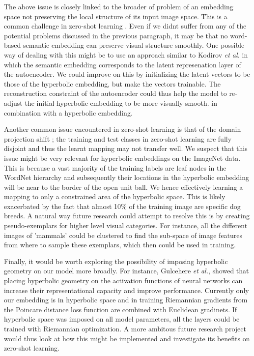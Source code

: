 \documentclass[12pt]{report}
\begin{document}
The above issue is closely linked to the broader of problem of an embedding space not preserving the local structure of its input image space. This is a common challenge in zero-shot learning \cite{Ji2017}. Even if we didnt suffer from any of the potential problems discussed in the previous paragraph, it may be that no word-based semantic embedding can preserve visual structure smoothly. One possible way of dealing with this might be to use an approach similar to Kodirov \textit{et al.} \cite{Kodirov2017} in which the semantic embedding corresponds to the latent represenation layer of the autoencoder. We could improve on this by initializing the latent vectors to be those of the hyperbolic embedding, but make the vectors trainable. The reconstruction constraint of the autoencoder could thus help the model to re-adjust the initial hyperbolic embedding to be more visually smooth.
in combination with a hyperbolic embedding. 

Another common issue encountered in zero-shot learning is that of the domain projection shift \cite{Fu2015}; the training and test classes in zero-shot learning are fully disjoint and thus the learnt mapping may not transfer well. We suspect that this issue might be very relevant for hyperbolic embeddings on the ImageNet data. This is because a vast majority of the training labels are leaf nodes in the WordNet hierarchy and subsequently their locations in the hyperbolic embedding will be near to the border of the open unit ball. We hence effectively learning a mapping to only a constrained area of the hyperbolic space. This is likely exacerbated by the fact that almost 10\% \cite{Peterson2018} of the training image are specific dog breeds. A natural way future research could attempt to resolve this is by creating pseudo-exemplars for higher level visual categories. For instance, all the different images of 'mammals' could be clustered to find the sub-space of image features from where to sample these exemplars, which then could be used in training.

Finally, it would be worth exploring the possibility of imposing hyperbolic geometry on our model more broadly. For instance, Gulcehere \textit{et al.}, showed that placing hyperbolic geometry on the activation functions of neural networks can increase their representational capacity and improve performance. Currently only our embedding is in hyperbolic space and in training Riemannian gradients from the Poincare distance loss function are combined with Euclidean gradinets. If hyperbolic space was imposed on all model parameters, all the layers could be trained with Riemannian optimization. A more ambitous future research project would thus look at how this might be implemented and investigate its benefits on zero-shot learning.
\end{document}
